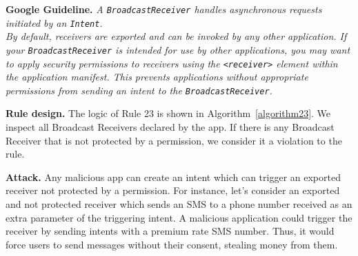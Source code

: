 \textbf{Google Guideline.} \emph{A \texttt{BroadcastReceiver} handles asynchronous requests initiated by an \texttt{Intent}.
\\
By default, receivers are exported and can be invoked by any other application. If your \texttt{BroadcastReceiver} is intended for use by other applications, you may want to apply security permissions to receivers using the \texttt{<receiver>} element within the application manifest. This prevents applications without appropriate permissions from sending an intent to the \texttt{BroadcastReceiver}.}

\textbf{Rule design.} The logic of Rule 23 is shown in Algorithm~\ref{algorithm23}. We inspect all Broadcast Receivers declared by the app. If there is any Broadcast Receiver that is not protected by a permission, we consider it a violation to the rule. 

\setcounter{algocf}{22}
\begin{algorithm}[]
\SetAlgoLined
{}
\caption{}
\label{algorithm23}
\end{algorithm}

\textbf{Attack.} Any malicious app can create an intent which can trigger an exported receiver not protected by a permission. For instance, let's consider an exported and not protected receiver which sends an SMS to a phone number received as an extra parameter of the triggering intent. A malicious application could trigger the receiver by sending intents with a premium rate SMS number. Thus, it would force users to send messages without their consent, stealing money from them. 


